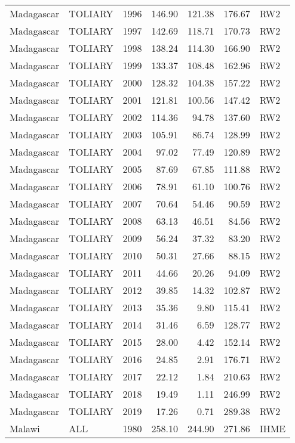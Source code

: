 \begin{longtable}{lllrrrl}
  Madagascar & TOLIARY & 1996 & 146.90 & 121.38 & 176.67 & RW2 \\ 
  Madagascar & TOLIARY & 1997 & 142.69 & 118.71 & 170.73 & RW2 \\ 
  Madagascar & TOLIARY & 1998 & 138.24 & 114.30 & 166.90 & RW2 \\ 
  Madagascar & TOLIARY & 1999 & 133.37 & 108.48 & 162.96 & RW2 \\ 
  Madagascar & TOLIARY & 2000 & 128.32 & 104.38 & 157.22 & RW2 \\ 
  Madagascar & TOLIARY & 2001 & 121.81 & 100.56 & 147.42 & RW2 \\ 
  Madagascar & TOLIARY & 2002 & 114.36 & 94.78 & 137.60 & RW2 \\ 
  Madagascar & TOLIARY & 2003 & 105.91 & 86.74 & 128.99 & RW2 \\ 
  Madagascar & TOLIARY & 2004 & 97.02 & 77.49 & 120.89 & RW2 \\ 
  Madagascar & TOLIARY & 2005 & 87.69 & 67.85 & 111.88 & RW2 \\ 
  Madagascar & TOLIARY & 2006 & 78.91 & 61.10 & 100.76 & RW2 \\ 
  Madagascar & TOLIARY & 2007 & 70.64 & 54.46 & 90.59 & RW2 \\ 
  Madagascar & TOLIARY & 2008 & 63.13 & 46.51 & 84.56 & RW2 \\ 
  Madagascar & TOLIARY & 2009 & 56.24 & 37.32 & 83.20 & RW2 \\ 
  Madagascar & TOLIARY & 2010 & 50.31 & 27.66 & 88.15 & RW2 \\ 
  Madagascar & TOLIARY & 2011 & 44.66 & 20.26 & 94.09 & RW2 \\ 
  Madagascar & TOLIARY & 2012 & 39.85 & 14.32 & 102.87 & RW2 \\ 
  Madagascar & TOLIARY & 2013 & 35.36 & 9.80 & 115.41 & RW2 \\ 
  Madagascar & TOLIARY & 2014 & 31.46 & 6.59 & 128.77 & RW2 \\ 
  Madagascar & TOLIARY & 2015 & 28.00 & 4.42 & 152.14 & RW2 \\ 
  Madagascar & TOLIARY & 2016 & 24.85 & 2.91 & 176.71 & RW2 \\ 
  Madagascar & TOLIARY & 2017 & 22.12 & 1.84 & 210.63 & RW2 \\ 
  Madagascar & TOLIARY & 2018 & 19.49 & 1.11 & 246.99 & RW2 \\ 
  Madagascar & TOLIARY & 2019 & 17.26 & 0.71 & 289.38 & RW2 \\ 
  Malawi & ALL & 1980 & 258.10 & 244.90 & 271.86 & IHME \\ 

\end{longtable}

